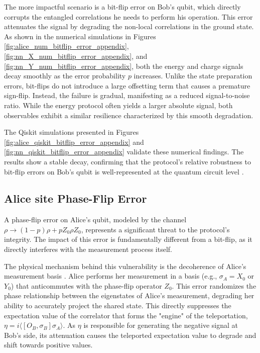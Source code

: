 The more impactful scenario is a bit-flip error on Bob's qubit, which directly corrupts the entangled correlations he needs to perform his operation. This error attenuates the signal by degrading the non-local correlations in the ground state. As shown in the numerical simulations in Figures \ref{fig:alice_num_bitflip_error_appendix}, \ref{fig:nn_X_num_bitflip_error_appendix}, and \ref{fig:nn_Y_num_bitflip_error_appendix}, both the energy and charge signals decay smoothly as the error probability $p$ increases. Unlike the state preparation errors, bit-flips do not introduce a large offsetting term that causes a premature sign-flip. Instead, the failure is gradual, manifesting as a reduced signal-to-noise ratio. While the energy protocol often yields a larger absolute signal, both observables exhibit a similar resilience characterized by this smooth degradation.

The Qiskit simulations presented in Figures \ref{fig:alice_qiskit_bitflip_error_appendix} and \ref{fig:nn_qiskit_bitflip_error_appendix} validate these numerical findings. The results show a stable decay, confirming that the protocol's relative robustness to bit-flip errors on Bob's qubit is well-represented at the quantum circuit level \cite{Lo2005, Wang2005}.

\subsection{Alice site Phase-Flip Error}



A phase-flip error on Alice's qubit, modeled by the channel $\rho \rightarrow (1-p)\rho + pZ_{0}\rho Z_{0}$, represents a significant threat to the protocol's integrity. The impact of this error is fundamentally different from a bit-flip, as it directly interferes with the measurement process itself.

The physical mechanism behind this vulnerability is the decoherence of Alice's measurement basis \cite{QKDbyQET, Lydersen2010, Zhao2008}. Alice performs her measurement in a basis (e.g., $\sigma_A = X_0$ or $Y_0$) that anticommutes with the phase-flip operator $Z_0$. This error randomizes the phase relationship between the eigenstates of Alice's measurement, degrading her ability to accurately project the shared state. This directly suppresses the expectation value of the correlator that forms the "engine" of the teleportation, $\eta = i\langle[O_B, \sigma_B]\sigma_A\rangle$. As $\eta$ is responsible for generating the negative signal at Bob's side, its attenuation causes the teleported expectation value to degrade and shift towards positive values.


